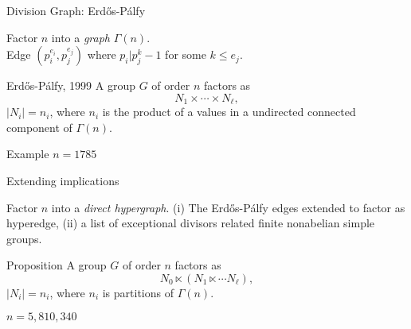 \documentclass{beamer}
\begin{document}
\begin{frame}{Division Graph: Erd\H{o}s-P\'{a}lfy}

Factor $n$ into a \emph{graph} $\Gamma(n)$.  \\
Edge $(p_i^{e_i},p_j^{e_j})$
where $p_i|p_j^k-1$ for some $k\leq e_j$.  

\begin{block}{Erd\H{o}s-P\'{a}lfy, 1999}
    A group $G$ of order $n$ factors as 
\[N_1\times \cdots \times N_{\ell},\] 
$|N_i|=n_i$, where $n_i$ is the product of a 
values in a undirected connected component of $\Gamma(n)$.
\end{block}

\begin{block}{Example $n=1785$}
\begin{center}
\end{center}
\end{block}


\end{frame}
    
\begin{frame}{Extending implications}

Factor $n$ into a \emph{direct hypergraph}.  (i) The Erd\H{o}s-P\'{a}lfy edges extended 
to factor as hyperedge, (ii) a list of exceptional divisors related finite nonabelian simple groups.

\begin{block}{Proposition}
    A group $G$ of order $n$ factors as 
\[N_0\ltimes (N_1\ltimes \cdots N_{\ell}),\] 
$|N_i|=n_i$, where $n_i$ is partitions of $\Gamma(n)$. 
\end{block}


\begin{block}{$n=5,810,340$}
\end{block}


\end{frame}
\end{document}
